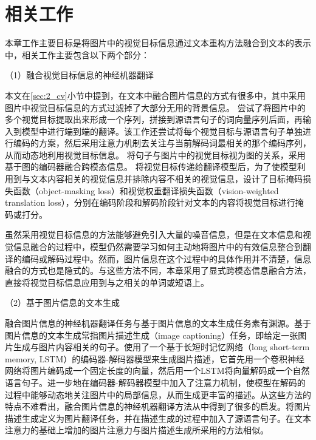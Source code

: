 \section{相关工作}



% 

本章工作主要目标是将图片中的视觉目标信息通过文本重构方法融合到文本的表示中，相关工作主要包含以下两个部分：

{\sffamily （1）融合视觉目标信息的神经机器翻译}

本文在\ref{sec:2_cv}小节中提到，在文本中融合图片信息的方式有很多中，其中采用图片中视觉目标信息的方式过滤掉了大部分无用的背景信息。
尝试了将图片中的多个视觉目标提取出来形成一个序列，拼接到源语言句子的词向量序列后面，再输入到模型中进行端到端的翻译。该工作还尝试将每个视觉目标与源语言句子单独进行编码的方案，然后采用注意力机制去关注与当前解码词最相关的那个编码序列，从而动态地利用视觉目标信息。
将句子与图片中的视觉目标视为图的关系，采用基于图的编码器融合跨模态信息。
将视觉目标传递给翻译模型后，为了使模型利用到与文本内容相关的视觉信息并排除内容不相关的视觉信息，设计了目标掩码损失函数（object-masking loss）和视觉权重翻译损失函数（vision-weighted translation loss），分别在编码阶段和解码阶段针对文本的内容将视觉目标进行掩码或打分。

虽然采用视觉目标信息的方法能够避免引入大量的噪音信息，但是在文本信息和视觉信息融合的过程中，模型仍然需要学习如何主动地将图片中的有效信息整合到翻译的编码或解码过程中。然而，图片信息在这个过程中的具体作用并不清楚，信息融合的方式也是隐式的。与这些方法不同，本章采用了显式跨模态信息融合方法，直接将视觉目标信息应用到与之相关的单词或短语上。

{\sffamily （2）基于图片信息的文本生成}

融合图片信息的神经机器翻译任务与基于图片信息的文本生成任务素有渊源。基于图片信息的文本生成常指图片描述生成（image captioning）任务，即给定一张图片生成与图片内容相关的句子。使用了一个基于长短时记忆网络（long short-term memory, LSTM）的编码器-解码器模型来生成图片描述，它首先用一个卷积神经网络将图片编码成一个固定长度的向量，然后用一个LSTM将向量解码成一个自然语言句子。进一步地在编码器-解码器模型中加入了注意力机制，使模型在解码的过程中能够动态地关注图片中的局部信息，从而生成更丰富的描述。从这些方法的特点不难看出，融合图片信息的神经机器翻译方法从中得到了很多的启发。将图片描述生成定义为图片翻译任务，并在描述生成的过程中加入了源语言句子。在文本注意力的基础上增加的图片注意力与图片描述生成所采用的方法相似。

